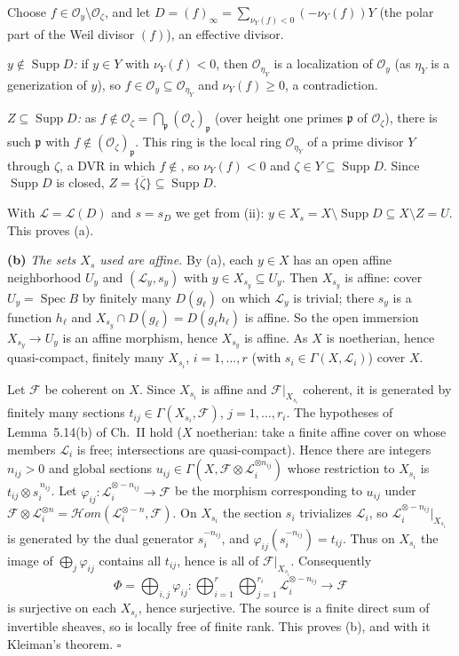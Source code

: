 \documentclass[11pt]{article}
\begin{document}
Choose $f\in\mathcal O_y\setminus\mathcal O_\zeta$, and let $D=(f)_\infty=\sum_{\nu_Y(f)<0}(-\nu_Y(f))Y$ (the polar part of the Weil divisor $(f)$), an effective divisor.

\emph{$y\notin\operatorname{Supp}D$:} if $y\in Y$ with $\nu_Y(f)<0$, then $\mathcal O_{\eta_Y}$ is a localization of $\mathcal O_y$ (as $\eta_Y$ is a generization of $y$), so $f\in\mathcal O_y\subseteq\mathcal O_{\eta_Y}$ and $\nu_Y(f)\ge0$, a contradiction.

\emph{$Z\subseteq\operatorname{Supp}D$:} as $f\notin\mathcal O_\zeta=\bigcap_{\mathfrak p}(\mathcal O_\zeta)_{\mathfrak p}$ (over height one primes $\mathfrak p$ of $\mathcal O_\zeta$), there is such $\mathfrak p$ with $f\notin(\mathcal O_\zeta)_{\mathfrak p}$. This ring is the local ring $\mathcal O_{\eta_Y}$ of a prime divisor $Y$ through $\zeta$, a DVR in which $f\notin$, so $\nu_Y(f)<0$ and $\zeta\in Y\subseteq\operatorname{Supp}D$. Since $\operatorname{Supp}D$ is closed, $Z=\overline{\{\zeta\}}\subseteq\operatorname{Supp}D$.

With $\mathcal L=\mathcal L(D)$ and $s=s_D$ we get from (ii): $y\in X_s=X\setminus\operatorname{Supp}D\subseteq X\setminus Z=U$. This proves (a).

\textbf{(b)} \emph{The sets $X_s$ used are affine.} By (a), each $y\in X$ has an open affine neighborhood $U_y$ and $(\mathcal L_y,s_y)$ with $y\in X_{s_y}\subseteq U_y$. Then $X_{s_y}$ is affine: cover $U_y=\operatorname{Spec}B$ by finitely many $D(g_\ell)$ on which $\mathcal L_y$ is trivial; there $s_y$ is a function $h_\ell$ and $X_{s_y}\cap D(g_\ell)=D(g_\ell h_\ell)$ is affine. So the open immersion $X_{s_y}\to U_y$ is an affine morphism, hence $X_{s_y}$ is affine. As $X$ is noetherian, hence quasi-compact, finitely many $X_{s_i}$, $i=1,\dots,r$ (with $s_i\in\Gamma(X,\mathcal L_i)$) cover $X$.

Let $\mathcal F$ be coherent on $X$. Since $X_{s_i}$ is affine and $\mathcal F|_{X_{s_i}}$ coherent, it is generated by finitely many sections $t_{ij}\in\Gamma(X_{s_i},\mathcal F)$, $j=1,\dots,r_i$. The hypotheses of Lemma~5.14(b) of Ch.~II hold ($X$ noetherian: take a finite affine cover on whose members $\mathcal L_i$ is free; intersections are quasi-compact). Hence there are integers $n_{ij}>0$ and global sections $u_{ij}\in\Gamma(X,\mathcal F\otimes\mathcal L_i^{\otimes n_{ij}})$ whose restriction to $X_{s_i}$ is $t_{ij}\otimes s_i^{\,n_{ij}}$. Let $\varphi_{ij}\colon\mathcal L_i^{\otimes-n_{ij}}\to\mathcal F$ be the morphism corresponding to $u_{ij}$ under $\mathcal F\otimes\mathcal L_i^{\otimes n}=\mathcal{H}om(\mathcal L_i^{\otimes-n},\mathcal F)$. On $X_{s_i}$ the section $s_i$ trivializes $\mathcal L_i$, so $\mathcal L_i^{\otimes-n_{ij}}|_{X_{s_i}}$ is generated by the dual generator $s_i^{-n_{ij}}$, and $\varphi_{ij}(s_i^{-n_{ij}})=t_{ij}$. Thus on $X_{s_i}$ the image of $\bigoplus_j\varphi_{ij}$ contains all $t_{ij}$, hence is all of $\mathcal F|_{X_{s_i}}$. Consequently
\[
\Phi=\bigoplus_{i,j}\varphi_{ij}\colon\bigoplus_{i=1}^r\bigoplus_{j=1}^{r_i}\mathcal L_i^{\otimes-n_{ij}}\to\mathcal F
\]
is surjective on each $X_{s_i}$, hence surjective. The source is a finite direct sum of invertible sheaves, so is locally free of finite rank. This proves (b), and with it Kleiman's theorem. \hfill$\square$
\end{document}
